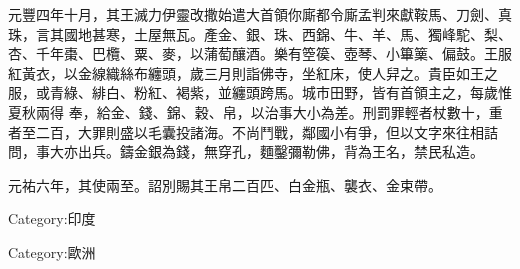 \begin{pinyinscope}
 元豐四年十月，其王滅力伊靈改撒始遣大首領你廝都令廝孟判來獻鞍馬、刀劍、真珠，言其國地甚寒，土屋無瓦。產金、銀、珠、西錦、牛、羊、馬、獨峰駝、梨、杏、千年棗、巴欖、粟、麥，以蒲萄釀酒。樂有箜篌、壺琴、小篳篥、偏鼓。王服紅黃衣，以金線織絲布纏頭，歲三月則詣佛寺，坐紅床，使人舁之。貴臣如王之服，或青綠、緋白、粉紅、褐紫，並纏頭跨馬。城市田野，皆有首領主之，每歲惟夏秋兩得
 奉，給金、錢、錦、穀、帛，以治事大小為差。刑罰罪輕者杖數十，重者至二百，大罪則盛以毛囊投諸海。不尚鬥戰，鄰國小有爭，但以文字來往相詰問，事大亦出兵。鑄金銀為錢，無穿孔，麵鑿彌勒佛，背為王名，禁民私造。



 元祐六年，其使兩至。詔別賜其王帛二百匹、白金瓶、襲衣、金束帶。



 Category:印度



 Category:歐洲



\end{pinyinscope}